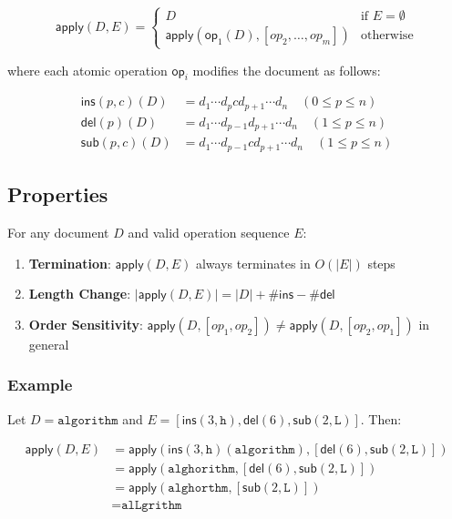\documentclass{article}
\begin{document}
\[
\mathsf{apply}(D, E) = 
\begin{cases}
D & \text{if } E = \emptyset \\
\mathsf{apply}(\mathsf{op}_1(D), [op_2, \ldots, op_m]) & \text{otherwise}
\end{cases}
\]

where each atomic operation $\mathsf{op}_i$ modifies the document as follows:

\begin{align*}
\mathsf{ins}(p,c)(D) &= d_1\cdots d_p c d_{p+1}\cdots d_n \quad (0 \leq p \leq n) \\
\mathsf{del}(p)(D) &= d_1\cdots d_{p-1} d_{p+1}\cdots d_n \quad (1 \leq p \leq n) \\
\mathsf{sub}(p,c)(D) &= d_1\cdots d_{p-1} c d_{p+1}\cdots d_n \quad (1 \leq p \leq n)
\end{align*}

\subsection{Properties}

\begin{center}
For any document $D$ and valid operation sequence $E$:
\begin{enumerate}
    \item \textbf{Termination}: $\mathsf{apply}(D, E)$ always terminates in $O(|E|)$ steps
    \item \textbf{Length Change}: $|\mathsf{apply}(D, E)| = |D| + \#\mathsf{ins} - \#\mathsf{del}$
    \item \textbf{Order Sensitivity}: $\mathsf{apply}(D, [op_1, op_2]) \neq \mathsf{apply}(D, [op_2, op_1])$ in general
\end{enumerate}
\end{center}

\subsubsection{Example}

\begin{center}
    
Let $D = \texttt{algorithm}$ and $E = [\mathsf{ins}(3,\texttt{h}), \mathsf{del}(6), \mathsf{sub}(2,\texttt{L})]$. Then:

\begin{align*}
\mathsf{apply}(D, E) &= \mathsf{apply}(\mathsf{ins}(3,\texttt{h})(\texttt{algorithm}), [\mathsf{del}(6), \mathsf{sub}(2,\texttt{L})]) \\
&= \mathsf{apply}(\texttt{alghorithm}, [\mathsf{del}(6), \mathsf{sub}(2,\texttt{L})]) \\
&= \mathsf{apply}(\texttt{alghorthm}, [\mathsf{sub}(2,\texttt{L})]) \\
&= \texttt{alLgrithm}
\end{align*}
\end{center}
\end{document}
